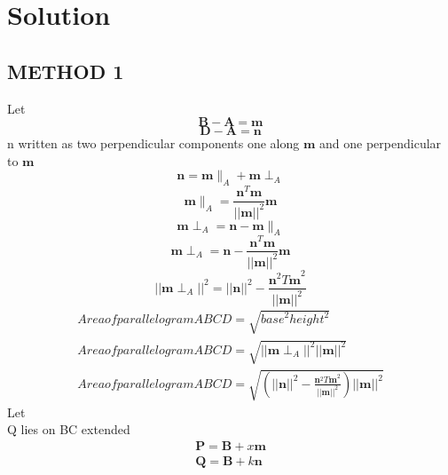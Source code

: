 \documentclass[journal,10pt,twocolumn]{article}
\begin{document}
\section*{Solution}
\subsection*{METHOD 1}

Let 
\begin{equation}
\boldsymbol{B-A} = \boldsymbol{m}
\end{equation}
\begin{equation}
\boldsymbol{D-A} = \boldsymbol{n} 
\end{equation}
n written as two perpendicular components one along $\boldsymbol{m}$ and one perpendicular to $\boldsymbol{m}$
\begin{equation}
   \boldsymbol{n}=\boldsymbol{m} \parallel_A +\boldsymbol{m} \perp_A
\end{equation}
\begin{equation}
\boldsymbol{m} \parallel_A ={\frac{\boldsymbol{n}^T\boldsymbol{m}}{||\boldsymbol{m}||^2}}\boldsymbol{m}
\end{equation}
\begin{equation}
\boldsymbol{m} \perp_A =\boldsymbol{n} - \boldsymbol{m} \parallel_A
\end{equation}
\begin{equation}
\boldsymbol{m} \perp_A=\boldsymbol{n}-{\frac{\boldsymbol{n}^T\boldsymbol{m}}{||\boldsymbol{m}||^2}}\boldsymbol{m}
\end{equation}
\begin{equation}
||\boldsymbol{m} \perp_A||^2=||\boldsymbol{n}||^2-{\frac{{\boldsymbol{n}^2T\boldsymbol{m}}^2}{||\boldsymbol{m}||^2}}
\end{equation}
\begin{eqnarray}
    Area of parallelogram ABCD =\sqrt{{base}^2{height}^2}\\
    Area of parallelogram ABCD =\sqrt{{||\boldsymbol{m} \perp_A}||^2{||\boldsymbol{m}||^2}}\\
    Area of parallelogram ABCD =\sqrt{(||\boldsymbol{n}||^2-{\frac{{\boldsymbol{n}^2T\boldsymbol{m}}^2}{||\boldsymbol{m}||^2}})||\boldsymbol{m}||^2}
\end{eqnarray}
Let\\
Q lies on BC extended
\begin{eqnarray}
    \boldsymbol{P}=\boldsymbol{B}+x\boldsymbol{m}\\
    \boldsymbol{Q}=\boldsymbol{B}+k\boldsymbol{n}
\end{eqnarray}
\end{document}
